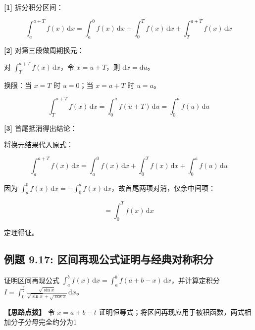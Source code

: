 \documentclass[11pt,a4paper,UTF8]{ctexart}
\begin{document}
\begin{solbox}[分步推导与答题规范]
\textbf{[1]} 拆分积分区间：


\begin{equation*}
\int_a^{a+T} f(x)\,\mathrm{d}x = \int_a^0 f(x)\,\mathrm{d}x + \int_0^T f(x)\,\mathrm{d}x + \int_T^{a+T} f(x)\,\mathrm{d}x
\end{equation*}


\textbf{[2]} 对第三段做周期换元：

对 $\int_T^{a+T} f(x)\,\mathrm{d}x$，令 $x = u + T$，则 $\mathrm{d}x = \mathrm{d}u$。

换限：当 $x = T$ 时 $u = 0$；当 $x = a+T$ 时 $u = a$。


\begin{equation*}
\int_T^{a+T} f(x)\,\mathrm{d}x = \int_0^a f(u+T)\,\mathrm{d}u = \int_0^a f(u)\,\mathrm{d}u
\end{equation*}


\textbf{[3]} 首尾抵消得出结论：

将换元结果代入原式：


\begin{equation*}
\int_a^{a+T} f(x)\,\mathrm{d}x = \int_a^0 f(x)\,\mathrm{d}x + \int_0^T f(x)\,\mathrm{d}x + \int_0^a f(u)\,\mathrm{d}u
\end{equation*}


因为 $\int_a^0 f(x)\,\mathrm{d}x = -\int_0^a f(x)\,\mathrm{d}x$，故首尾两项对消，仅余中间项：


\begin{equation*}
= \int_0^T f(x)\,\mathrm{d}x
\end{equation*}


定理得证。
\end{solbox}


\subsection{例题 9.17: 区间再现公式证明与经典对称积分}

证明区间再现公式 $\int_a^b f(x)\,\mathrm{d}x = \int_a^b f(a+b-x)\,\mathrm{d}x$，并计算定积分 $I = \int_0^{\frac{\pi}{2}} \frac{\sqrt{\sin x}}{\sqrt{\sin x} + \sqrt{\cos x}}\,\mathrm{d}x$。

\textbf{\color{DeepPurple}【思路点拨】} 令 $x = a+b-t$ 证明恒等式；将区间再现应用于被积函数，两式相加分子分母完全约分为1
\end{document}
